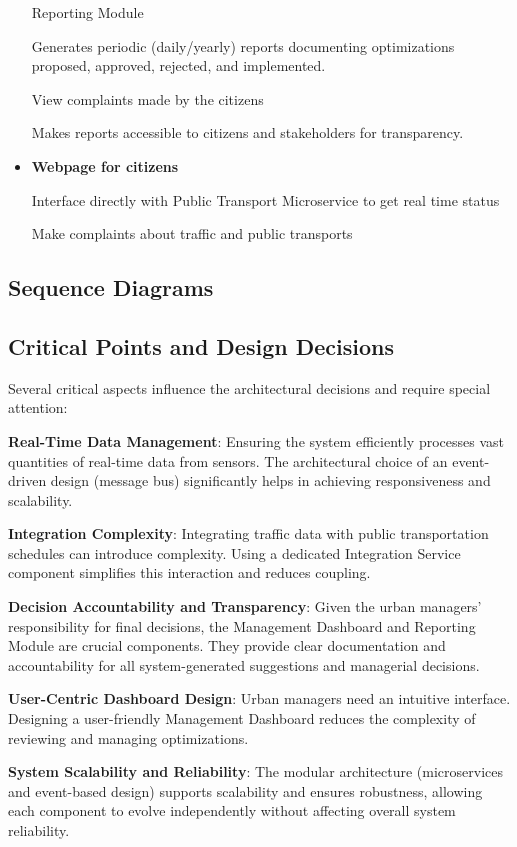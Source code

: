 \documentclass[a4paper,12pt]{article}
\begin{document}
\begin{itemize}
Reporting Module

Generates periodic (daily/yearly) reports documenting optimizations proposed, approved, rejected, and implemented.

View complaints made by the citizens

Makes reports accessible to citizens and stakeholders for transparency.

\item \textbf{Webpage for citizens}

Interface directly with Public Transport Microservice to get real time status

Make complaints about traffic and public transports

\end{itemize}

\subsection{Sequence Diagrams}

\subsection{Critical Points and Design Decisions}

Several critical aspects influence the architectural decisions and require special attention:


\textbf{Real-Time Data Management}:
Ensuring the system efficiently processes vast quantities of real-time data from sensors. The architectural choice of an event-driven design (message bus) significantly helps in achieving responsiveness and scalability.

\textbf{Integration Complexity}:
Integrating traffic data with public transportation schedules can introduce complexity. Using a dedicated Integration Service component simplifies this interaction and reduces coupling.

\textbf{Decision Accountability and Transparency}:
Given the urban managers' responsibility for final decisions, the Management Dashboard and Reporting Module are crucial components. They provide clear documentation and accountability for all system-generated suggestions and managerial decisions.

\textbf{User-Centric Dashboard Design}:
Urban managers need an intuitive interface. Designing a user-friendly Management Dashboard reduces the complexity of reviewing and managing optimizations.

\textbf{System Scalability and Reliability}:
The modular architecture (microservices and event-based design) supports scalability and ensures robustness, allowing each component to evolve independently without affecting overall system reliability.
\end{document}
